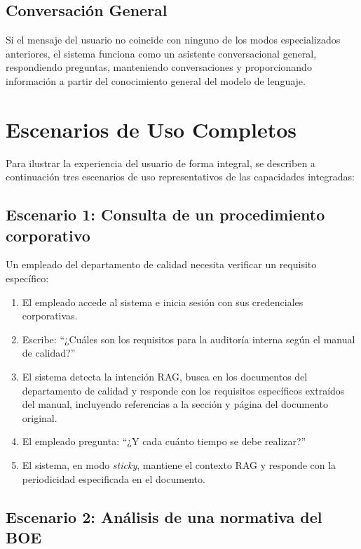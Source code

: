\subsection{Conversación General}
\label{subsec:modo-chat}

Si el mensaje del usuario no coincide con ninguno de los modos especializados anteriores, el sistema funciona como un asistente conversacional general, respondiendo preguntas, manteniendo conversaciones y proporcionando información a partir del conocimiento general del modelo de lenguaje.

\section{Escenarios de Uso Completos}
\label{sec:escenarios}

Para ilustrar la experiencia del usuario de forma integral, se describen a continuación tres escenarios de uso representativos de las capacidades integradas:

\subsection{Escenario 1: Consulta de un procedimiento corporativo}

Un empleado del departamento de calidad necesita verificar un requisito específico:

\begin{enumerate}
    \item El empleado accede al sistema e inicia sesión con sus credenciales corporativas.
    \item Escribe: ``¿Cuáles son los requisitos para la auditoría interna según el manual de calidad?''
    \item El sistema detecta la intención RAG, busca en los documentos del departamento de calidad y responde con los requisitos específicos extraídos del manual, incluyendo referencias a la sección y página del documento original.
    \item El empleado pregunta: ``¿Y cada cuánto tiempo se debe realizar?''
    \item El sistema, en modo \textit{sticky}, mantiene el contexto RAG y responde con la periodicidad especificada en el documento.
\end{enumerate}

\subsection{Escenario 2: Análisis de una normativa del BOE}

